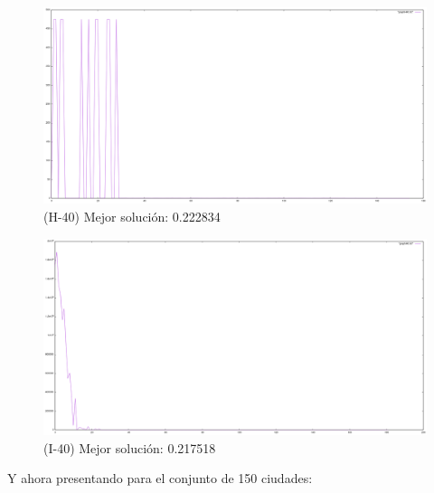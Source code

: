\documentclass{article}
\begin{document}
  \begin{figure}[!h]
    \includegraphics[scale=0.35]{H40}
    \caption{(H-40) Mejor solución: 0.222834} 
  \end{figure}
  \begin{figure}[!h]
    \includegraphics[scale=0.35]{I40}
    \caption{(I-40) Mejor solución: 0.217518} 
  \end{figure}

  \clearpage

  Y ahora presentando para el conjunto de 150 
  ciudades:
\end{document}

